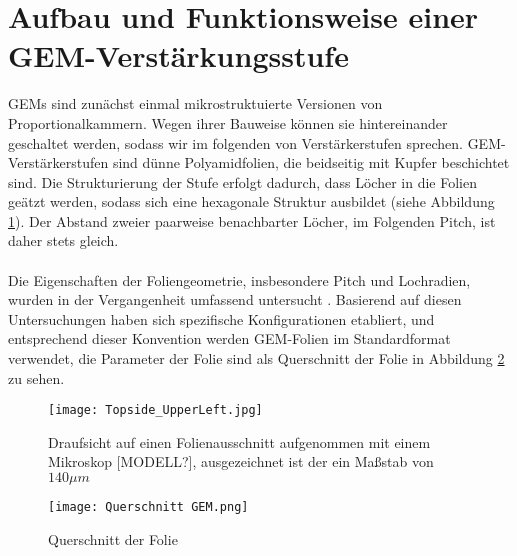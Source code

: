 \section{Aufbau und Funktionsweise einer GEM-Verstärkungsstufe} 
  GEMs sind zunächst einmal mikrostruktuierte Versionen von Proportionalkammern. Wegen ihrer Bauweise können sie hintereinander geschaltet werden, sodass wir im folgenden von Verstärkerstufen sprechen. GEM-Verstärkerstufen sind dünne Polyamidfolien, die beidseitig mit Kupfer beschichtet sind. Die Strukturierung der Stufe erfolgt dadurch, dass Löcher in die Folien geätzt werden, sodass sich eine hexagonale Struktur ausbildet (siehe Abbildung \ref{fig:Draufsicht}). Der Abstand zweier paarweise benachbarter Löcher, im Folgenden Pitch, ist daher stets gleich.\\
  \\
   Die Eigenschaften der Foliengeometrie, insbesondere Pitch und Lochradien, wurden in der Vergangenheit umfassend untersucht \cite{Sauli_Übersicht}. Basierend auf diesen Untersuchungen haben sich spezifische Konfigurationen etabliert, und entsprechend dieser Konvention werden GEM-Folien im Standardformat verwendet, die Parameter der Folie sind als Querschnitt der Folie in Abbildung \ref{fig:Querschnitt} zu sehen.

	\begin{figure}[h]
		\centering
		\texttt{[image: Topside\_UpperLeft.jpg]}
		\caption{Draufsicht auf einen Folienausschnitt aufgenommen mit einem Mikroskop [MODELL?], ausgezeichnet ist der ein Maßstab von $140 \si{\mu m}$}
		\label{fig:Draufsicht}
	\end{figure}

	\begin{figure}[h]
		\centering
		\texttt{[image: Querschnitt GEM.png]}
		\caption{Querschnitt der Folie}
		\label{fig:Querschnitt}
	\end{figure}
		
		
		
